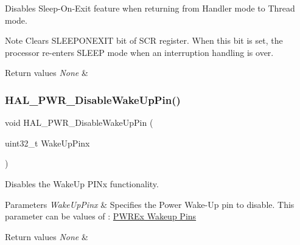 Disables Sleep-\/\+On-\/\+Exit feature when returning from Handler mode to Thread mode. 

\begin{DoxyNote}{Note}
Clears S\+L\+E\+E\+P\+O\+N\+E\+X\+IT bit of S\+CR register. When this bit is set, the processor re-\/enters S\+L\+E\+EP mode when an interruption handling is over. 
\end{DoxyNote}

\begin{DoxyRetVals}{Return values}
{\em None} & \\
\hline
\end{DoxyRetVals}
\mbox{\label{group___p_w_r___exported___functions___group2_gab12ca816929e23e36f5ed8f4ccdb1472}} 
\subsubsection{\texorpdfstring{H\+A\+L\+\_\+\+P\+W\+R\+\_\+\+Disable\+Wake\+Up\+Pin()}{HAL\_PWR\_DisableWakeUpPin()}}
{\footnotesize\ttfamily void H\+A\+L\+\_\+\+P\+W\+R\+\_\+\+Disable\+Wake\+Up\+Pin (\begin{DoxyParamCaption}\item[{uint32\+\_\+t}]{Wake\+Up\+Pinx }\end{DoxyParamCaption})}



Disables the Wake\+Up P\+I\+Nx functionality. 


\begin{DoxyParams}{Parameters}
{\em Wake\+Up\+Pinx} & Specifies the Power Wake-\/\+Up pin to disable. This parameter can be values of \+: \hyperlink{group___p_w_r_ex___wake_up___pins}{P\+W\+R\+Ex Wakeup Pins} \\
\hline
\end{DoxyParams}

\begin{DoxyRetVals}{Return values}
{\em None} & \\
\hline
\end{DoxyRetVals}
\mbox{\label{group___p_w_r___exported___functions___group2_ga3d07cef39bf294db4aed7e06e5dbf9af}} 
